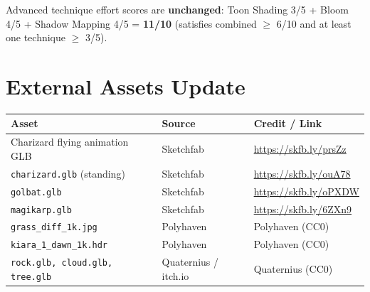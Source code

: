 \documentclass[11pt,a4paper]{article}
\begin{document}
\medskip
\noindent Advanced technique effort scores are \textbf{unchanged}:
Toon Shading 3/5 + Bloom 4/5 + Shadow Mapping 4/5 = \textbf{11/10} \checkmark
\quad(satisfies combined $\geq$ 6/10 and at least one technique $\geq$ 3/5).

\section{External Assets Update}

\begin{tabular}{@{} L{4.2cm} L{2.8cm} L{6.5cm} @{}}
\toprule
\textbf{Asset} & \textbf{Source} & \textbf{Credit / Link} \\
\midrule
Charizard flying animation GLB
  & Sketchfab
  & \url{https://skfb.ly/prsZz} \\[4pt]
\texttt{charizard.glb} (standing)
  & Sketchfab
  & \url{https://skfb.ly/ouA78} \\[4pt]
\texttt{golbat.glb}
  & Sketchfab
  & \url{https://skfb.ly/oPXDW} \\[4pt]
\texttt{magikarp.glb}
  & Sketchfab
  & \url{https://skfb.ly/6ZXn9} \\[4pt]
\texttt{grass\_diff\_1k.jpg}
  & Polyhaven
  & Polyhaven (CC0) \\[4pt]
\texttt{kiara\_1\_dawn\_1k.hdr}
  & Polyhaven
  & Polyhaven (CC0) \\[4pt]
\texttt{rock.glb, cloud.glb, tree.glb}
  & Quaternius / itch.io
  & Quaternius (CC0) \\
\bottomrule
\end{tabular}
\end{document}
